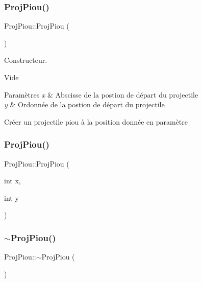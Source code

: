 \subsubsection{\texorpdfstring{Proj\+Piou()}{ProjPiou()}\hspace{0.1cm}{\footnotesize\ttfamily [1/2]}}
{\footnotesize\ttfamily Proj\+Piou\+::\+Proj\+Piou (\begin{DoxyParamCaption}{ }\end{DoxyParamCaption})}



Constructeur. 

Vide


\begin{DoxyParams}{Paramètres}
{\em x} & Abscisse de la postion de départ du projectile \\
\hline
{\em y} & Ordonnée de la postion de départ du projectile\\
\hline
\end{DoxyParams}
Créer un projectile piou à la position donnée en paramètre \mbox{\label{class_proj_piou_a4aa12294ad8b563aa00848e395fdf06b}} 
\subsubsection{\texorpdfstring{Proj\+Piou()}{ProjPiou()}\hspace{0.1cm}{\footnotesize\ttfamily [2/2]}}
{\footnotesize\ttfamily Proj\+Piou\+::\+Proj\+Piou (\begin{DoxyParamCaption}\item[{int}]{x,  }\item[{int}]{y }\end{DoxyParamCaption})}

\mbox{\label{class_proj_piou_a02224f153ad53afc2b1c40b986ec6492}} 
\subsubsection{\texorpdfstring{$\sim$\+Proj\+Piou()}{~ProjPiou()}}
{\footnotesize\ttfamily Proj\+Piou\+::$\sim$\+Proj\+Piou (\begin{DoxyParamCaption}{ }\end{DoxyParamCaption})}



